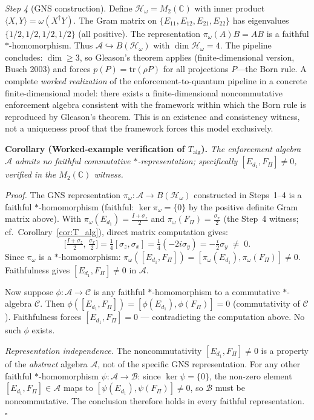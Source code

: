 \documentclass[11pt]{article}
\theoremstyle{remark}
\begin{document}
\begin{tcolorbox}[apfbox, title={T2: Noncommutativity $\to$ Operator Algebra on Hilbert Space}]
\textit{Step 4} (GNS construction).  Define $\mathcal{H}_\omega = M_2(\mathbb{C})$ with inner product $\langle X, Y \rangle = \omega(X^\dagger Y)$.  The Gram matrix on $\{E_{11}, E_{12}, E_{21}, E_{22}\}$ has eigenvalues $\{1/2, 1/2, 1/2, 1/2\}$ (all positive).  The representation $\pi_\omega(A)B = AB$ is a faithful $*$-homomorphism.  Thus $\mathcal{A} \hookrightarrow B(\mathcal{H}_\omega)$ with $\dim \mathcal{H}_\omega = 4$.  The pipeline concludes: $\dim \ge 3$, so Gleason's theorem applies (finite-dimensional version, Busch 2003) and forces $p(P) = \mathrm{tr}(\rho P)$ for all projections $P$---the Born rule.  A complete \emph{worked realization} of the enforcement-to-quantum pipeline in a concrete finite-dimensional model: there exists a finite-dimensional noncommutative enforcement algebra consistent with the framework within which the Born rule is reproduced by Gleason's theorem.  This is an existence and consistency witness, not a uniqueness proof that the framework forces this model exclusively.

\medskip
\noindent\textbf{Corollary (Worked-example verification of $T_{\mathrm{alg}}$).}
\label{cor:T_alg_fullpipeline}
\emph{The enforcement algebra $\mathcal{A}$ admits no faithful commutative $*$-representation; specifically $[E_{d_1}, F_\Pi] \ne 0$, verified in the $M_2(\mathbb{C})$ witness.}

\textit{Proof.}
The GNS representation $\pi_\omega: \mathcal{A} \to B(\mathcal{H}_\omega)$ constructed in Steps~1--4 is a faithful $*$-homomorphism (faithful: $\ker\pi_\omega = \{0\}$ by the positive definite Gram matrix above).  With $\pi_\omega(E_{d_1}) = \frac{I+\sigma_z}{2}$ and $\pi_\omega(F_\Pi) = \frac{\sigma_x}{2}$ (the Step~4 witness; cf.\ Corollary~\ref{cor:T_alg}), direct matrix computation gives:
\[
\bigl[\tfrac{I+\sigma_z}{2},\, \tfrac{\sigma_x}{2}\bigr]
= \tfrac{1}{4}[\sigma_z, \sigma_x]
= \tfrac{1}{4}(-2i\sigma_y)
= -\tfrac{i}{2}\sigma_y \;\ne\; 0.
\]
Since $\pi_\omega$ is a $*$-homomorphism: $\pi_\omega([E_{d_1},F_\Pi]) = [\pi_\omega(E_{d_1}),\pi_\omega(F_\Pi)] \ne 0$.  Faithfulness gives $[E_{d_1},F_\Pi] \ne 0$ in $\mathcal{A}$.

Now suppose $\phi: \mathcal{A} \to \mathcal{C}$ is any faithful $*$-homomorphism to a commutative $*$-algebra $\mathcal{C}$.  Then $\phi([E_{d_1},F_\Pi]) = [\phi(E_{d_1}),\phi(F_\Pi)] = 0$ (commutativity of $\mathcal{C}$).  Faithfulness forces $[E_{d_1},F_\Pi] = 0$ — contradicting the computation above.  No such $\phi$ exists.

\textit{Representation independence.}  The noncommutativity $[E_{d_1},F_\Pi]\ne 0$ is a property of the \emph{abstract} algebra $\mathcal{A}$, not of the specific GNS representation.  For any other faithful $*$-homomorphism $\psi: \mathcal{A} \to \mathcal{B}$: since $\ker\psi = \{0\}$, the non-zero element $[E_{d_1},F_\Pi] \in \mathcal{A}$ maps to $[\psi(E_{d_1}),\psi(F_\Pi)] \ne 0$, so $\mathcal{B}$ must be noncommutative.  The conclusion therefore holds in every faithful representation.  \hfill$\square$


\end{tcolorbox}
\end{document}

